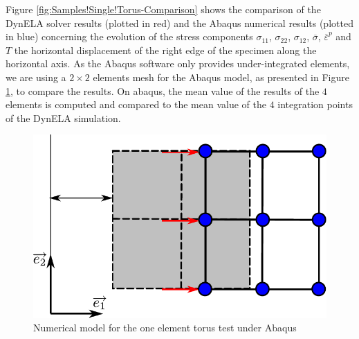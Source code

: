 Figure \ref{fig:Samples!Single!Torus-Comparison} shows the comparison
of the DynELA solver results (plotted in red) and the Abaqus numerical
results (plotted in blue) concerning the evolution of the stress components
$\sigma_{11}$, $\sigma_{22}$, $\sigma_{12}$, $\overline{\sigma}$,
$\overline{\varepsilon}^{p}$ and $T$ \versus  the horizontal displacement
of the right edge of the specimen along the horizontal axis. As the
Abaqus software only provides under-integrated elements, we are using
a $2\times2$ elements mesh for the Abaqus model, as presented in
Figure \ref{fig:Samples!Single!Torus-Abaqus}, to compare the results.
On abaqus, the mean value of the results of the $4$ elements is computed
and compared to the mean value of the $4$ integration points of the
DynELA simulation.
\begin{figure}[h]
\begin{centering}
\includegraphics[width=0.5\columnwidth]{Figures/SamplesSingleTorusAbaqus}
\par\end{centering}
\caption{Numerical model for the one element torus test under Abaqus\label{fig:Samples!Single!Torus-Abaqus}}
\end{figure}

